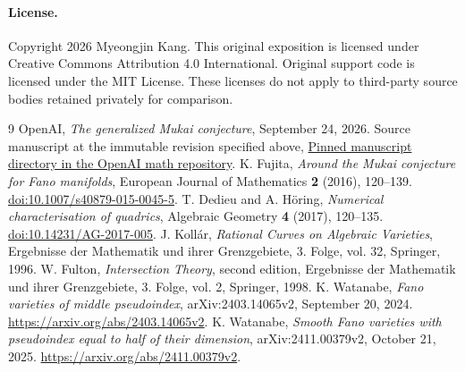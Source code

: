 \documentclass[11pt]{article}
\theoremstyle{definition}\newtheorem{definition}[theorem]{Definition}
\theoremstyle{remark}\newtheorem{remark}[theorem]{Remark}
\begin{document}
\paragraph{License.} Copyright 2026 Myeongjin Kang. This original exposition
is licensed under Creative Commons Attribution 4.0 International. Original
support code is licensed under the MIT License. These licenses do not apply
to third-party source bodies retained privately for comparison.

\begin{thebibliography}{9}
 OpenAI, \emph{The generalized Mukai conjecture}, September
24, 2026. Source manuscript at the immutable revision specified above,
\href{https://github.com/openai/math/tree/fd4aeeb2ee4fc729c18d98444fed42fd0529eeeb/preprints/The-Generalized-Mukai-Conjecture-September-24-2026}{Pinned manuscript directory in the OpenAI math repository}.
 K. Fujita, \emph{Around the Mukai conjecture for Fano
manifolds}, European Journal of Mathematics \textbf{2} (2016), 120--139.
\href{https://doi.org/10.1007/s40879-015-0045-5}{doi:10.1007/s40879-015-0045-5}.
 T. Dedieu and A. H\"oring, \emph{Numerical characterisation of
quadrics}, Algebraic Geometry \textbf{4} (2017), 120--135.
\href{https://doi.org/10.14231/AG-2017-005}{doi:10.14231/AG-2017-005}.
 J. Koll\'ar, \emph{Rational Curves on Algebraic Varieties},
Ergebnisse der Mathematik und ihrer Grenzgebiete, 3. Folge, vol. 32,
Springer, 1996.
 W. Fulton, \emph{Intersection Theory}, second edition,
Ergebnisse der Mathematik und ihrer Grenzgebiete, 3. Folge, vol. 2,
Springer, 1998.
 K. Watanabe, \emph{Fano varieties of middle
pseudoindex}, arXiv:2403.14065v2, September 20, 2024.
\url{https://arxiv.org/abs/2403.14065v2}.
 K. Watanabe, \emph{Smooth Fano varieties with
pseudoindex equal to half of their dimension}, arXiv:2411.00379v2,
October 21, 2025. \url{https://arxiv.org/abs/2411.00379v2}.
\end{thebibliography}
\end{document}
